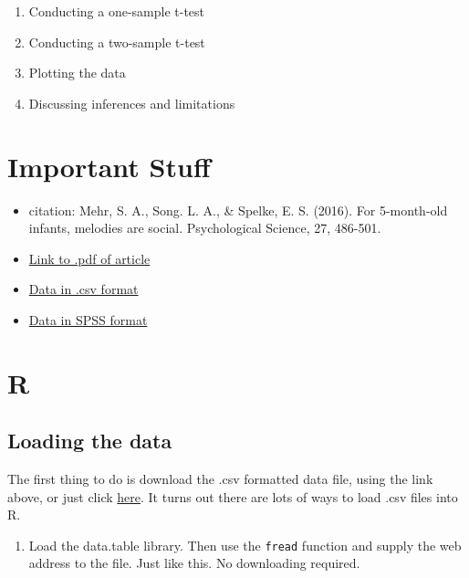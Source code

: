 \documentclass[]{book}
\providecommand{\tightlist}{%
  \setlength{\itemsep}{0pt}\setlength{\parskip}{0pt}}
\theoremstyle{definition}
\theoremstyle{definition}
\theoremstyle{definition}
\theoremstyle{remark}
\begin{document}
\begin{enumerate}
\def\labelenumi{\arabic{enumi}.}
\tightlist
\item
  Conducting a one-sample t-test
\item
  Conducting a two-sample t-test
\item
  Plotting the data
\item
  Discussing inferences and limitations
\end{enumerate}

\section{Important Stuff}\label{important-stuff}

\begin{itemize}
\tightlist
\item
  citation: Mehr, S. A., Song. L. A., \& Spelke, E. S. (2016). For
  5-month-old infants, melodies are social. Psychological Science, 27,
  486-501.
\item
  \href{http://journals.sagepub.com/stoken/default+domain/d5HcBHg85XamSXGdYqYN/full}{Link
  to .pdf of article}
\item
  \href{https://drive.google.com/open?id=0Bz-rhZ21ShvOdW1wV0pmUTJSSk0}{Data
  in .csv format}
\item
  \href{https://drive.google.com/open?id=0Bz-rhZ21ShvOa3c4X3hqOWxwcUU}{Data
  in SPSS format}
\end{itemize}

\section{R}\label{r-6}

\subsection{Loading the data}\label{loading-the-data}

The first thing to do is download the .csv formatted data file, using
the link above, or just click
\href{https://drive.google.com/open?id=0Bz-rhZ21ShvOdW1wV0pmUTJSSk0}{here}.
It turns out there are lots of ways to load .csv files into R.

\begin{enumerate}
\def\labelenumi{\arabic{enumi}.}
\tightlist
\item
  Load the data.table library. Then use the \texttt{fread} function and
  supply the web address to the file. Just like this. No downloading
  required.
\end{enumerate}
\end{document}
